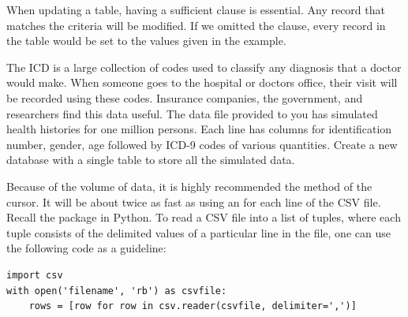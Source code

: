 \begin{info}
When updating a table, having a sufficient  clause is essential.  Any record that matches the criteria will be modified.
If we omitted the  clause, every record in the table would be set to the values given in the example.
\end{info}

\begin{problem}
The ICD is a large collection of codes used to classify any diagnosis that a doctor would make.
When someone goes to the hospital or doctors office, their visit will be recorded using these codes.
Insurance companies, the government, and researchers find this data useful.
The data file provided to you has simulated health histories for one million persons.
Each line has columns for identification number, gender, age followed by ICD-9 codes of various quantities.
Create a new database with a single table to store all the simulated data.

Because of the volume of data, it is highly recommended the  method of the cursor.
It will be about twice as fast as using an  for each line of the CSV file.
Recall the  package in Python. To read a CSV file into a list of tuples, where each tuple consists
of the delimited values of a particular line in the file, one can use the following code as a guideline:
\begin{lstlisting}
import csv
with open('filename', 'rb') as csvfile:
    rows = [row for row in csv.reader(csvfile, delimiter=',')]
\end{lstlisting}
\label{prob:icd9tables}
\end{problem}

